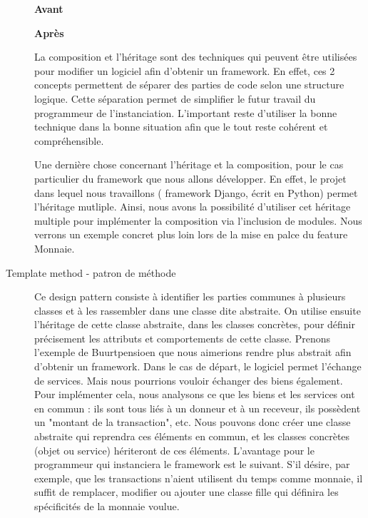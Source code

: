 \begin{description}
\vspace{0.3cm}
\begin{minipage}{.5\textwidth}
\begin{center} \textbf{Avant}

\end{center}
\end{minipage}
\hspace{0.3cm}
\begin{minipage}{.5\textwidth}
\begin{center} \textbf{Après}\end{center}


\end{minipage}
\vspace{0.3cm}

La composition et l'héritage sont des techniques qui peuvent être utilisées pour modifier un logiciel afin d'obtenir un framework.  En effet,  ces 2 concepts permettent de séparer des parties de code selon une structure logique.  Cette séparation permet de simplifier le futur travail du programmeur de l'instanciation.  L'important reste d'utiliser la bonne technique dans la bonne situation afin que le tout reste cohérent et compréhensible.  


\label{inclMod}
Une dernière chose concernant l'héritage et la composition,  pour le cas particulier du framework que nous allons développer.  En effet,  le projet dans lequel nous travaillons ( framework Django,  écrit en Python) permet l'héritage mutliple.  Ainsi,  nous avons la possibilité d'utiliser cet héritage multiple pour implémenter la composition via l'inclusion de modules.  Nous verrons un exemple concret plus loin lors de la mise en palce du feature Monnaie.
\vspace{1cm}
\item[Template method - patron de méthode]
Ce design pattern consiste à identifier les parties communes à plusieurs classes et à les rassembler dans une classe dite abstraite.  On utilise ensuite l'héritage de cette classe abstraite,  dans les classes concrètes,  pour définir précisement les attributs et comportements de cette classe.  Prenons l'exemple de Buurtpensioen que nous aimerions rendre plus abstrait afin d'obtenir un framework.  Dans le cas de départ,  le logiciel permet l'échange de services.  Mais nous pourrions vouloir échanger des biens également.  Pour implémenter cela,  nous analysons ce que les biens et les services ont en commun : ils sont tous liés à un donneur et à un receveur,  ils possèdent un "montant de la transaction",  etc.  Nous pouvons donc créer une classe abstraite qui reprendra ces éléments en commun,  et les classes concrètes (objet ou service) hériteront de ces éléments.  L'avantage pour le programmeur qui instanciera le framework est le suivant.  S'il désire,  par exemple,  que les transactions n'aient utilisent du temps comme monnaie,  il suffit de remplacer,  modifier ou ajouter une classe fille qui définira les spécificités de la monnaie voulue.  


\end{description}
